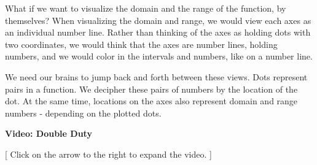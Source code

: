 \documentclass{ximera}
\begin{document}
What if we want to visualize the domain and the range of the function, by themselves?  When visualizing the domain and range, we would view each axes as an individual number line.  Rather than thinking of the axes as holding dots with two coordinates, we would think that the axes are number lines, holding numbers, and we would color in the intervals and numbers, like on a number line.

We need our brains to jump back and forth between these views.  Dots represent pairs in a function.  We decipher these pairs of numbers by the location of the dot.  At the same time, locations on the axes also represent domain and range numbers - depending on the plotted dots.





\begin{explanation} \textbf{Video: Double Duty}

[ Click on the arrow to the right to expand the video. ]
\begin{expandable} 

\begin{center}
\end{center}

\end{expandable}
\end{explanation}
\end{document}

